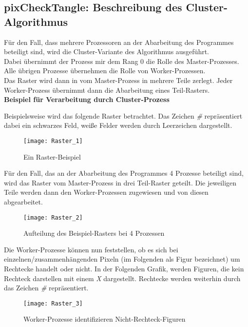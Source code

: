 \documentclass[
10pt, %
a4paper, %
oneside, %
headinclude,footinclude, %
BCOR5mm, %
]{scrartcl}
\begin{document}
\subsection{pixCheckTangle: Beschreibung des Cluster-Algorithmus}

Für den Fall, dass mehrere Prozessoren an der Abarbeitung des Programmes beteiligt sind, wird die Cluster-Variante des Algorithmus ausgeführt.\\
Dabei übernimmt der Prozess mir dem Rang 0 die Rolle des Master-Prozesses. Alle übrigen Prozesse übernehmen die Rolle von Worker-Prozessen. \\
Das Raster wird dann in vom Master-Prozess in mehrere Teile zerlegt. Jeder Worker-Prozess übernimmt dann die Abarbeitung eines Teil-Rasters. \\

\textbf{Beispiel für Verarbeitung durch Cluster-Prozess}

Beispielsweise wird das folgende Raster betrachtet. Das Zeichen \textit{\#} repräsentiert dabei ein schwarzes Feld, weiße Felder werden durch Leerzeichen dargestellt.
\begin{figure}[h]
	\centering 
	\texttt{[image: Raster\_1]} 
	\caption[Cluster-Prozess: Beispiel-Raster]{Ein Raster-Beispiel }
\end{figure}

Für den Fall, das an der Abarbeitung des Programmes 4 Prozesse beteiligt sind, wird das Raster vom Master-Prozess in drei Teil-Raster geteilt. Die jeweiligen Teile werden dann den Worker-Prozessen zugewiesen und von diesen abgearbeitet.

\begin{figure}[h]
	\centering 
	\texttt{[image: Raster\_2]} 
	\caption[Cluster-Prozess: Aufteilung Beispiel-Raster mit 4 Prozessen]{Aufteilung des Beispiel-Rasters bei 4 Prozessen}
\end{figure}

Die Worker-Prozesse können nun feststellen, ob es sich bei einzelnen/zusammenhängenden Pixeln (im Folgenden als Figur bezeichnet) um Rechtecke handelt oder nicht. In der Folgenden Grafik, werden Figuren, die kein Rechteck darstellen mit einem \textit{X} dargestellt. Rechtecke werden weiterhin durch das Zeichen \textit{\#} repräsentiert.

\begin{figure}[h]
	\centering 
	\texttt{[image: Raster\_3]} 
	\caption[Cluster-Prozess: Worker-Prozess: Nicht-Rechteck-Figuren]{Worker-Prozesse identifizieren Nicht-Rechteck-Figuren}
\end{figure}
\end{document}
